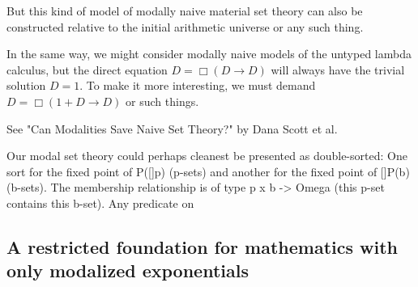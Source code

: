 \begin{TODOblock}
But this kind of model of modally naive material set theory can also be constructed relative to the initial arithmetic universe or any such thing.

In the same way, we might consider modally naive models of the untyped lambda calculus, but the direct equation $D = \Box(D \to D)$ will always have the trivial solution $D = 1$. To make it more interesting, we must demand $D = \Box(1 + D \to D)$ or such things.

See "Can Modalities Save Naive Set Theory?" by Dana Scott et al.

Our modal set theory could perhaps cleanest be presented as double-sorted: One sort for the fixed point of P([]p) (p-sets) and another for the fixed point of []P(b) (b-sets). The membership relationship is of type p x b -> Omega (this p-set contains this b-set). Any predicate on 
\end{TODOblock}

\subsection{A restricted foundation for mathematics with only modalized exponentials}
\TODO

\fileend
